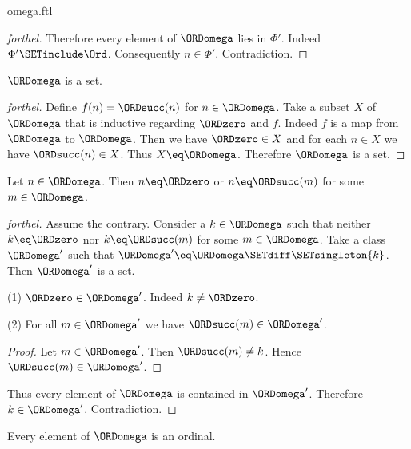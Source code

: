 \documentclass{naproche-library}
\begin{document}
\begin{smodule}[title=The Ordinal $\omega$]{omega.ftl}
\begin{proof}[forthel]
  Therefore every element of $\ORDomega$ lies in $\Phi'$.
  Indeed $\Phi' \SETinclude \Ord$.
  Consequently $n \in \Phi'$.
  Contradiction.
\end{proof}

\begin{corollary}[forthel,id=SET_THEORY_03_4847727433220096]
  $\ORDomega$ is a set.
\end{corollary}
\begin{proof}[forthel]
  Define $f(n) = \ORDsucc(n)$ for $n \in \ORDomega$.
  Take a subset $X$ of $\ORDomega$ that is inductive regarding $\ORDzero$ and $f$.
  Indeed $f$ is a map from $\ORDomega$ to $\ORDomega$.
  Then we have $\ORDzero \in X$ and for each $n \in X$ we have $\ORDsucc(n) \in X$.
  Thus $X \eq \ORDomega$.
  Therefore $\ORDomega$ is a set.
\end{proof}

\begin{proposition}[forthel,id=SET_THEORY_03_5885789275684864]
  Let $n \in \ORDomega$.
  Then $n \eq \ORDzero$ or $n \eq \ORDsucc(m)$ for some $m \in \ORDomega$.
\end{proposition}
\begin{proof}[forthel]
  Assume the contrary.
  Consider a $k \in \ORDomega$ such that neither $k \eq \ORDzero$ nor $k \eq \ORDsucc(m)$ for
  some $m \in \ORDomega$.
  Take a class $\ORDomega'$ such that $\ORDomega' \eq \ORDomega \SETdiff \SETsingleton{k}$. %
  Then $\ORDomega'$ is a set.

  (1) $\ORDzero \in \ORDomega'$.
  Indeed $k \neq \ORDzero$.

  (2) For all $m \in \ORDomega'$ we have $\ORDsucc(m) \in \ORDomega'$.
  \begin{proof}
    Let $m \in \ORDomega'$.
    Then $\ORDsucc(m) \neq k$.
    Hence $\ORDsucc(m) \in \ORDomega'$.
  \end{proof}

  Thus every element of $\ORDomega$ is contained in $\ORDomega'$.
  Therefore $k \in \ORDomega'$.
  Contradiction.
\end{proof}

\begin{proposition}[forthel,id=SET_THEORY_03_5057540872208384]
  Every element of $\ORDomega$ is an ordinal.
\end{proposition}
\end{smodule}
\end{document}
